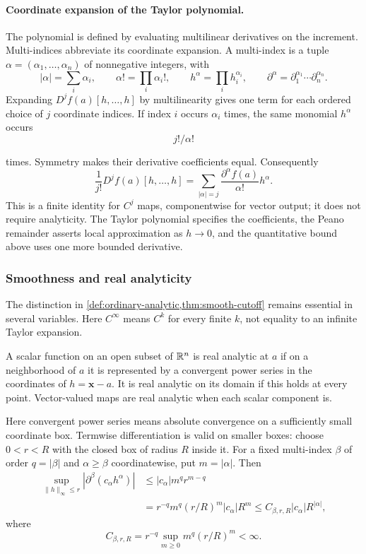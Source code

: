 \paragraph{Coordinate expansion of the Taylor polynomial.}
The polynomial is defined by evaluating multilinear derivatives on the
increment. Multi-indices abbreviate its coordinate expansion.
A multi-index is a tuple $\alpha=(\alpha_1,\ldots,\alpha_n)$
of nonnegative integers, with
\[
|\alpha|=\sum_i\alpha_i,\qquad \alpha!=\prod_i\alpha_i!,\qquad
h^\alpha=\prod_i h_i^{\alpha_i},\qquad
\partial^\alpha=\partial_1^{\alpha_1}\cdots\partial_n^{\alpha_n}.
\]
Expanding $D^jf(a)[h,\ldots,h]$ by multilinearity gives one term for
each ordered choice of $j$ coordinate indices. If index $i$ occurs
$\alpha_i$ times, the same monomial $h^\alpha$ occurs
\[
j!/\alpha!
\]

times. Symmetry makes their derivative coefficients equal. Consequently
\[
\frac1{j!}D^jf(a)[h,\ldots,h]
=\sum_{|\alpha|=j}\frac{\partial^\alpha f(a)}{\alpha!}h^\alpha.
\]
This is a finite identity for $C^j$ maps, componentwise for vector output;
it does not require analyticity. The Taylor polynomial specifies the
coefficients, the Peano remainder asserts local approximation as $h\to0$,
and the quantitative bound above uses one more bounded derivative.

\subsubsection*{Smoothness and real analyticity}
The distinction in \cref{def:ordinary-analytic,thm:smooth-cutoff} remains
essential in several variables. Here $C^\infty$ means $C^k$ for every
finite $k$, not equality to an infinite Taylor expansion.
\begin{definition}
A scalar function on an open subset of $\mathbb{R}^n$ is real analytic at $a$
if on a neighborhood of $a$ it is represented by a convergent power
series in the coordinates of $h=\mathbf{x}-a$. It is real analytic on its domain
if this holds at every point. Vector-valued maps are real analytic when
each scalar component is.
\end{definition}
Here convergent power series means absolute convergence on a sufficiently
small coordinate box. Termwise differentiation is valid on smaller boxes:
choose $0<r<R$ with the closed box of radius $R$ inside it. For a fixed
multi-index $\beta$ of order $q=|\beta|$ and $\alpha\geq\beta$
coordinatewise, put $m=|\alpha|$. Then
\[
\begin{aligned}
\sup_{\|h\|_\infty\leq r}|\partial^\beta(c_\alpha h^\alpha)|
&\leq |c_\alpha|m^q r^{m-q}\\
&=r^{-q}m^q(r/R)^m|c_\alpha|R^m
\leq C_{\beta,r,R}|c_\alpha|R^{|\alpha|},
\end{aligned}
\]
where
\[
C_{\beta,r,R}=r^{-q}\sup_{m\geq0}m^q(r/R)^m<\infty.
\]

